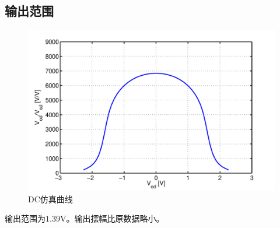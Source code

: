 \documentclass[a4paper]{article}
\newcommand{\uV}{\si{\volt}}
\begin{document}
\subsection{输出范围}
\begin{figure}[htb]
    \begin{center}
        \includegraphics[width=\textwidth]{slow/dc.pdf}
    \end{center}
    \caption{DC仿真曲线}
    \label{slowdc}
\end{figure}
输出范围为$1.39\uV$。输出摆幅比原数据略小。
\newpage
\end{document}

